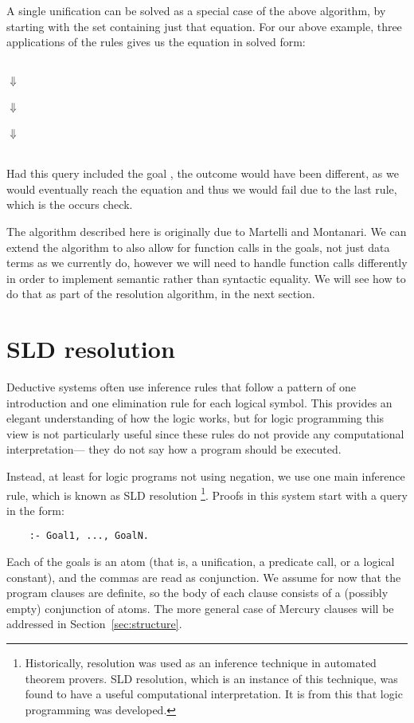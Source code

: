 A single unification can be solved
as a special case of the above algorithm,
by starting with the set containing just that equation.
For our above example,
three applications of the rules gives us
the equation in solved form:
\begin{center}
 \\
$\Downarrow$ \\
 \\
$\Downarrow$ \\
 \\
$\Downarrow$ \\
 \\[1.5em]
\end{center}
Had this query included the goal ,
the outcome would have been different,
as we would eventually reach the equation 
and thus we would fail due to the last rule,
which is the occurs check.

The algorithm described here
is originally due to Martelli and Montanari.
We can extend the algorithm
to also allow for function calls in the goals,
not just data terms as we currently do,
however we will need to handle function calls differently
in order to implement
semantic rather than syntactic equality.
We will see how to do that as part of the resolution algorithm,
in the next section.


\section{SLD resolution}
\label{sec:resolution}

Deductive systems often use
inference rules that follow a pattern of
one introduction and one elimination rule
for each logical symbol.
This provides an elegant understanding of how the logic works,
but for logic programming this view is not particularly useful
since these rules do not provide any computational interpretation---%
they do not say how a program should be executed.

Instead, at least for logic programs not using negation,
we use one main inference rule,
which is known as SLD resolution\label{gi:resolution}%
\footnote{
Historically,
resolution was used as an inference technique
in automated theorem provers.
SLD resolution, which is an instance of this technique,
was found to have a useful computational interpretation.
It is from this that logic programming was developed.
}.
Proofs in this system start with a query in the form:
\begin{verbatim}
    :- Goal1, ..., GoalN.
\end{verbatim}
Each of the goals is an atom
(that is, a unification, a predicate call, or a logical constant),
and the commas are read as conjunction.
We assume for now that the program clauses are definite,
so the body of each clause
consists of a (possibly empty) conjunction of atoms.
The more general case of Mercury clauses
will be addressed in Section~\ref{sec:structure}.

